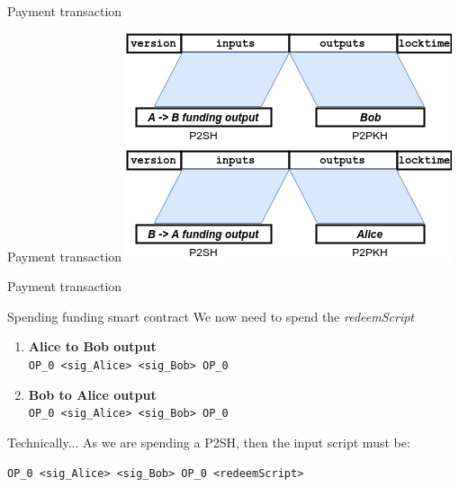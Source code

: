 \documentclass{beamer}
\begin{document}
\begin{frame}{Payment transaction}
 \begin{exampleblock}{Payment transaction}
  \includegraphics[width=\textwidth, height=0.8\textheight, keepaspectratio]{img/bidir_tx_payment.png}
 \end{exampleblock}
\end{frame}
\begin{frame}{Payment transaction}
 \begin{exampleblock}{Spending funding smart contract}
  We now need to spend the \textit{redeemScript}
  \pause
  \begin{center}
   \begin{enumerate}[<+->]
    \item \textbf{Alice to Bob output}\\
          \small{\texttt{OP\_0 <sig\_Alice> <sig\_Bob> OP\_0}}
    \item \textbf{Bob to Alice output}\\
          \small{\texttt{OP\_0 <sig\_Alice> <sig\_Bob> OP\_0}}
   \end{enumerate}
  \end{center}
 \end{exampleblock}
 \begin{exampleblock}{Technically...}
  As we are spending a P2SH, then the input script must be:\
  \begin{center}
   \texttt{OP\_0 <sig\_Alice> <sig\_Bob> OP\_0 <redeemScript>}
  \end{center}

 \end{exampleblock}
\end{frame}
\end{document}
